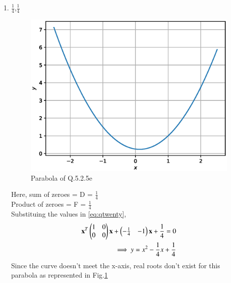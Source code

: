 \begin{enumerate}[label=\thesection.\arabic*.,ref=\thesection.\theenumi]
\begin{enumerate}
		\item $\frac{1}{4}$,$\frac{1}{4}$
	\begin{figure}[!ht]
	\centering
	\includegraphics[width=\columnwidth]{./figs/conics/q20e.eps}
	\caption{Parabola of Q.5.2.5e}
	\label{fig:qtoe}	
	\end{figure}
		
\solution 
Here, sum of zeroes = D = $\frac{1}{4}$\\
Product of zeroes = F = $\frac{1}{4}$\\
Substituing the values in \ref{eq:qtwenty},\\

\begin{align}
\mathbf{x}^T\begin{pmatrix}1&0\\0&0\end{pmatrix}\mathbf{x}  + \begin{pmatrix}-\frac{1}{4}&-1\end{pmatrix}\mathbf{x} + \frac{1}{4} = 0\\
\implies y = x^2 - \frac{1}{4}x + \frac{1}{4} 
\end{align}
Since the curve doesn't meet the x-axis, real roots don't exist for this parabola as represented in Fig.\ref{fig:qtoe}	


\end{enumerate}
\end{enumerate}

